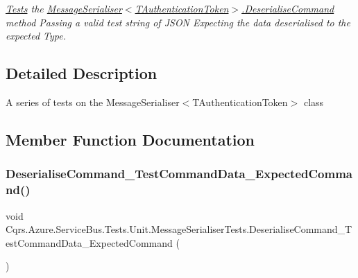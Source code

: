 \begin{DoxyCompactItemize}
\begin{DoxyCompactList}\small\item\em \hyperlink{namespaceCqrs_1_1Azure_1_1ServiceBus_1_1Tests}{Tests} the \hyperlink{classCqrs_1_1Azure_1_1ServiceBus_1_1MessageSerialiser_a7cbab381f4758f8dd04cd17e2c5f2c3a_a7cbab381f4758f8dd04cd17e2c5f2c3a}{Message\+Serialiser$<$\+T\+Authentication\+Token$>$.\+Deserialise\+Command} method Passing a valid test string of J\+S\+ON Expecting the data deserialised to the expected Type. \end{DoxyCompactList}\end{DoxyCompactItemize}


\subsection{Detailed Description}
A series of tests on the Message\+Serialiser$<$\+T\+Authentication\+Token$>$ class 



\subsection{Member Function Documentation}
\mbox{\label{classCqrs_1_1Azure_1_1ServiceBus_1_1Tests_1_1Unit_1_1MessageSerialiserTests_a33c0538a90a7ed653350ccc7d3c38f49_a33c0538a90a7ed653350ccc7d3c38f49}} 
\subsubsection{\texorpdfstring{Deserialise\+Command\+\_\+\+Test\+Command\+Data\+\_\+\+Expected\+Command()}{DeserialiseCommand\_TestCommandData\_ExpectedCommand()}}
{\footnotesize\ttfamily void Cqrs.\+Azure.\+Service\+Bus.\+Tests.\+Unit.\+Message\+Serialiser\+Tests.\+Deserialise\+Command\+\_\+\+Test\+Command\+Data\+\_\+\+Expected\+Command (\begin{DoxyParamCaption}{ }\end{DoxyParamCaption})}



